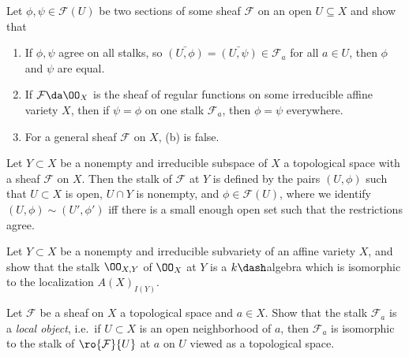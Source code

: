 \begin{problem}[Gathmann 3.22]

Let \(\phi, \psi \in \mathcal{F}(U)\) be two sections of some sheaf
\(\mathcal{F}\) on an open \(U\subseteq X\) and show that

\begin{enumerate}
\def\labelenumi{\alph{enumi}.}
\item
  If \(\phi, \psi\) agree on all stalks, so
  \(\bar{(U, \phi)} = \bar{(U, \psi)} \in \mathcal{F}_a\) for all
  \(a\in U\), then \(\phi\) and \(\psi\) are equal.
\item
  If \(\mathcal{F} \da \OO_X\) is the sheaf of regular functions on some
  irreducible affine variety \(X\), then if \(\psi = \phi\) on one stalk
  \(\mathcal{F}_a\), then \(\phi = \psi\) everywhere.
\item
  For a general sheaf \(\mathcal{F}\) on \(X\), (b) is false.
\end{enumerate}

\end{problem}

\begin{definition}

Let \(Y\subset X\) be a nonempty and irreducible subspace of \(X\) a
topological space with a sheaf \(\mathcal{F}\) on \(X\). Then the stalk
of \(\mathcal{F}\) at \(Y\) is defined by the pairs \((U, \phi)\) such
that \(U\subset X\) is open, \(U\cap Y\) is nonempty, and
\(\phi \in \mathcal{F}(U)\), where we identify
\((U, \phi) \sim (U',\phi')\) iff there is a small enough open set such
that the restrictions agree.

\end{definition}

\begin{problem}

Let \(Y\subset X\) be a nonempty and irreducible subvariety of an affine
variety \(X\), and show that the stalk \(\OO_{X, Y}\) of \(\OO_X\) at
\(Y\) is a \(k\dash\)algebra which is isomorphic to the localization
\(A(X)_{I(Y)}\).

\end{problem}

\begin{problem}[Gathmann 3.24]

Let \(\mathcal{F}\) be a sheaf on \(X\) a topological space and
\(a\in X\). Show that the stalk \(\mathcal{F}_a\) is a \emph{local
object}, i.e.~if \(U\subset X\) is an open neighborhood of \(a\), then
\(\mathcal{F}_a\) is isomorphic to the stalk of
\(\ro{ \mathcal{F} }{U}\) at \(a\) on \(U\) viewed as a topological
space.

\end{problem}

